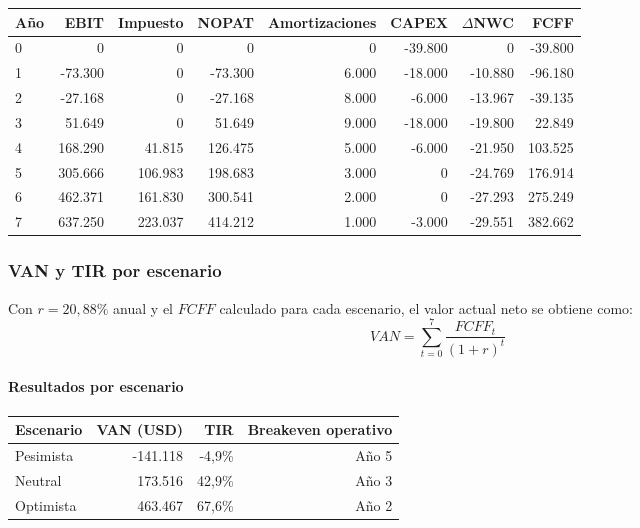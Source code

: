 \begin{center}
\label{tab:fcff_churn}
\footnotesize
\begin{adjustbox}{width=\textwidth,center}
\begin{tabular}{lrrrrrrr}
\toprule
\textbf{Año} & \textbf{EBIT} & \textbf{Impuesto} & \textbf{NOPAT} & \textbf{Amortizaciones} & \textbf{CAPEX} & \textbf{$\Delta$NWC} & \textbf{FCFF} \\
\midrule
0 & 0 & 0 & 0 & 0 & -39.800 & 0 & -39.800 \\
1 & -73.300 & 0 & -73.300 & 6.000 & -18.000 & -10.880 & -96.180 \\
2 & -27.168 & 0 & -27.168 & 8.000 & -6.000 & -13.967 & -39.135 \\
3 & 51.649 & 0 & 51.649 & 9.000 & -18.000 & -19.800 & 22.849 \\
4 & 168.290 & 41.815 & 126.475 & 5.000 & -6.000 & -21.950 & 103.525 \\
5 & 305.666 & 106.983 & 198.683 & 3.000 & 0 & -24.769 & 176.914 \\
6 & 462.371 & 161.830 & 300.541 & 2.000 & 0 & -27.293 & 275.249 \\
7 & 637.250 & 223.037 & 414.212 & 1.000 & -3.000 & -29.551 & 382.662 \\
\bottomrule
\end{tabular}
\end{adjustbox}
\end{center}

\subsubsection{VAN y TIR por escenario}

Con $r = 20{,}88\%$ anual y el $FCFF$ calculado para cada escenario, el valor actual neto se obtiene como:
\[
VAN = \sum_{t=0}^{7}\frac{FCFF_t}{(1+r)^t}
\]

\paragraph{Resultados por escenario}

\begin{center}
\label{tab:van-escenarios}
\footnotesize
\begin{tabular}{l r r r}
\toprule
\textbf{Escenario} & \textbf{VAN (USD)} & \textbf{TIR} & \textbf{Breakeven operativo} \\
\midrule
Pesimista & -141.118 & -4,9\% & Año 5 \\
Neutral & 173.516 & 42,9\% & Año 3 \\
Optimista & 463.467 & 67,6\% & Año 2 \\
\bottomrule
\end{tabular}
\end{center}

